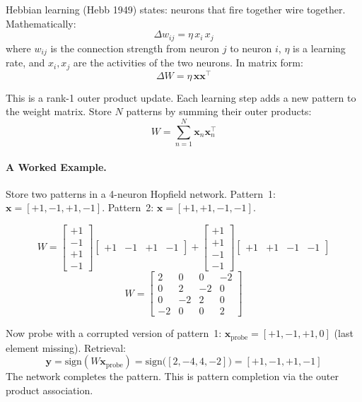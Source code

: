\documentclass[11pt,a4paper]{article}
\begin{document}
Hebbian learning (Hebb 1949) states: neurons that fire together wire together. Mathematically:
\[
  \Delta w_{ij} = \eta \, x_i \, x_j
\]
where $w_{ij}$ is the connection strength from neuron $j$ to neuron $i$, $\eta$ is a learning rate, and $x_i, x_j$ are the activities of the two neurons. In matrix form:
\[
  \Delta W = \eta \, \mathbf{x} \mathbf{x}^\top
\]

This is a rank-1 outer product update. Each learning step adds a new pattern to the weight matrix. Store $N$ patterns by summing their outer products:
\[
  W = \sum_{n=1}^{N} \mathbf{x}_n \mathbf{x}_n^\top
\]

\paragraph{A Worked Example.}

Store two patterns in a 4-neuron Hopfield network. Pattern~1: $\mathbf{x} = [+1, -1, +1, -1]$. Pattern~2: $\mathbf{x} = [+1, +1, -1, -1]$.

\[
  W = \begin{bmatrix}+1\\-1\\+1\\-1\end{bmatrix}
      \begin{bmatrix}+1&-1&+1&-1\end{bmatrix}
    + \begin{bmatrix}+1\\+1\\-1\\-1\end{bmatrix}
      \begin{bmatrix}+1&+1&-1&-1\end{bmatrix}
\]
\[
  W = \begin{bmatrix}
    2 & 0 & 0 & -2 \\
    0 & 2 & -2 & 0 \\
    0 & -2 & 2 & 0 \\
    -2 & 0 & 0 & 2
  \end{bmatrix}
\]

Now probe with a corrupted version of pattern~1: $\mathbf{x}_{\mathrm{probe}} = [+1, -1, +1, 0]$ (last element missing). Retrieval:
\[
  \mathbf{y} = \mathrm{sign}(W \mathbf{x}_{\mathrm{probe}})
             = \mathrm{sign}\!\bigl([2, -4, 4, -2]\bigr)
             = [+1, -1, +1, -1]
\]
The network completes the pattern. This is pattern completion via the outer product association.
\end{document}
